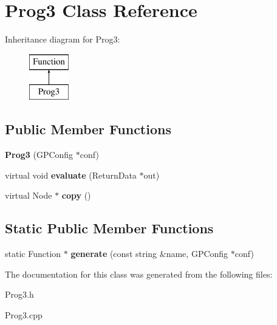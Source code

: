 \hypertarget{class_prog3}{\section{Prog3 Class Reference}
\label{class_prog3}
}
Inheritance diagram for Prog3\-:\begin{figure}[H]
\begin{center}
\leavevmode
\includegraphics[height=2.000000cm]{class_prog3}
\end{center}
\end{figure}
\subsection*{Public Member Functions}
\begin{DoxyCompactItemize}
\item 
\hypertarget{class_prog3_a97abd230e67701241ff9b55211813175}{{\bfseries Prog3} (G\-P\-Config $\ast$conf)}\label{class_prog3_a97abd230e67701241ff9b55211813175}

\item 
\hypertarget{class_prog3_a03860caf456da8eca8a9e2e324d7df05}{virtual void {\bfseries evaluate} (Return\-Data $\ast$out)}\label{class_prog3_a03860caf456da8eca8a9e2e324d7df05}

\item 
\hypertarget{class_prog3_a398d905914e1a6d7bb81ad97f97e9fa1}{virtual Node $\ast$ {\bfseries copy} ()}\label{class_prog3_a398d905914e1a6d7bb81ad97f97e9fa1}

\end{DoxyCompactItemize}
\subsection*{Static Public Member Functions}
\begin{DoxyCompactItemize}
\item 
\hypertarget{class_prog3_a3632b942186a76c3eac8b2c97b964d62}{static Function $\ast$ {\bfseries generate} (const string \&name, G\-P\-Config $\ast$conf)}\label{class_prog3_a3632b942186a76c3eac8b2c97b964d62}

\end{DoxyCompactItemize}


The documentation for this class was generated from the following files\-:\begin{DoxyCompactItemize}
\item 
Prog3.\-h\item 
Prog3.\-cpp\end{DoxyCompactItemize}
